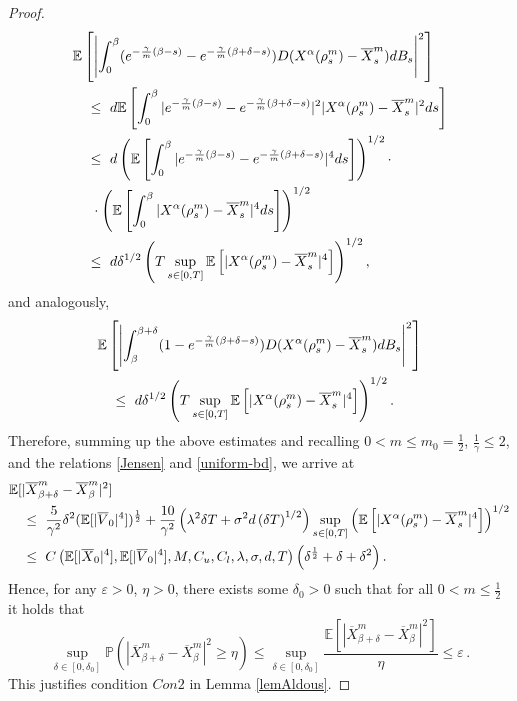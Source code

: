 \documentclass{ims9x6}
\newcommand{\nn}{\nonumber}
\newcommand{\EE}{\mathbb{E}}
\newcommand{\TE}{\mathcal{F}}
\newcommand{\PP}{\mathbb{P}}
\newcommand{\OV}{\overline{V}}
\newcommand{\OX}{\overline{X}}
\begin{document}
\begin{proof}
{\begin{align}
	&\EE\left[\left|\int_0^\beta (e^{-\frac{\gamma}{m}(\beta-s)}-e^{-\frac{\gamma}{m}(\beta+\delta-s)})D(X^{\alpha}(\rho_s^m)-\OX_s^m)d B_s\right|^2\right]\notag\\
	&\quad\leq \  d  \EE\left[\int_0^{\beta} |e^{-\frac{\gamma}{m}(\beta-s)}-e^{-\frac{\gamma}{m}(\beta+\delta-s)}|^2|X^{\alpha}(\rho_s^m)-\OX_s^m|^2ds\right]
	\notag\\
	&\quad\leq \  d\left(\EE\left[\int_0^{\beta} |e^{-\frac{\gamma}{m}(\beta-s)}-e^{-\frac{\gamma}{m}(\beta+\delta-s)}|^4 ds \right] \right)^{1/2}\cdot\nn\\
&\quad \ \cdot \left(\EE\left[\int_0^{\beta} |X^{\alpha}(\rho_s^m)-\OX_s^m|^4ds\right]\right)^{1/2}\notag\\
	&\quad\leq \  d  \delta^{1/2} \left(T \sup_{s\in[0,T]}  \EE\left[    |X^{\alpha}(\rho_s^m)-\OX_s^m|^4 \right]\right)^{1/2}, \nonumber
	\end{align}}
	and analogously,
	\begin{align}
	&\EE\left[\left|\int_\beta^{\beta+\delta} (1-e^{-\frac{\gamma}{m}(\beta+\delta-s)}) D(X^{\alpha}(\rho_s^m)-\OX_s^m)dB_s\right|^2\right]
	\notag\\
	&\quad\leq \  d  \delta^{1/2} \left(T \sup_{s\in[0,T]}  \EE\left[    |X^{\alpha}(\rho_s^m)-\OX_s^m|^4 \right]\right)^{1/2} . \nonumber
	\end{align}
	Therefore, summing up the above estimates and recalling  $0<m\leq m_0=\frac{1}{2}$, $\frac{1}{\gamma}\leq 2$, and the relations \eqref{Jensen} and \eqref{uniform-bd}, we arrive at
{\small 	\begin{align}
	&\EE[|\OX_{\beta+\delta}^m-\OX_{\beta}^m|^2] \nn\\
	&\quad\leq \ \frac{5}{\gamma^2} 
	\delta^2
	(\EE[|\OV_0|^4])^{\frac{1}{2}} 
	+\frac{10}{\gamma^2} 
	\left(\lambda^2  \delta T + \sigma^2d \left(\delta T\right)^{1/2} \right)
	\sup_{s\in[0,T]}  \left(\EE\left[    |X^{\alpha}(\rho_s^m)-\OX_s^m|^4 \right] \right)^{1/2}
	\notag\\
	&\quad\leq \ 
	C\left(\EE[|\OX_0|^4],\EE[|\OV_0|^4],M,C_u,C_l,\lambda,\sigma,d,T\right)
	\left(\delta^{\frac{1}{2}} + \delta+ \delta^2 \right). \nonumber
	\end{align}}
	Hence, for any $\varepsilon>0$, $\eta>0$, there exists some $\delta_0>0$ such that for all $0<m\leq \frac{1}{2}$ it holds that
	\begin{equation}
	\sup_{\delta\in[0,\delta_0]}\PP(|\OX_{\beta+\delta}^m-\OX_{\beta}^m|^2\geq \eta)\leq \sup_{\delta\in[0,\delta_0]}\frac{\EE[|\OX_{\beta+\delta}^m-\OX_{\beta}^m|^2]}{\eta}\leq \varepsilon\,.
	\end{equation}
	This justifies condition $Con 2$ in Lemma \ref{lemAldous}.  
\end{proof}
\end{document}

